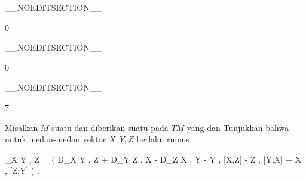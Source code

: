 __NOEDITSECTION__

{0}

{

}
{  }

__NOEDITSECTION__

{0}

{

}
{  }

__NOEDITSECTION__

{7}

{

Misalkan $M$ suatu
dan diberikan suatu
pada
$TM$ yang
dan
Tunjukkan bahwa untuk medan-medan vektor $X,Y,Z$ berlaku rumus

\mavergleichskettedisp
{\vergleichskette
{ \left\langle \nabla_X Y , Z  \right\rangle
}
{ =} { {  }  \left(  D_X \left\langle  Y  ,  Z  \right\rangle +  D_Y \left\langle  Z  ,  X  \right\rangle -  D_Z \left\langle  X  ,  Y  \right\rangle  - \left\langle  Y  , [X,Z]   \right\rangle - \left\langle  Z  , [Y,X]   \right\rangle + \left\langle  X  , [Z,Y]   \right\rangle   \right)
}
{ } {
}
{ } {
}
{ } {
}
}
{}{}{.}

}
